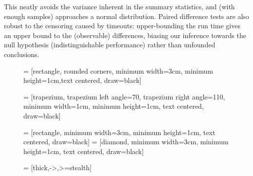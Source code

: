 This neatly avoids the variance inherent in the summary statistics, and (with
enough samples) approaches a normal distribution. Paired difference tests are
also robust to the censoring caused by timeouts: upper-bounding the run time
gives an upper bound to the (observable) differences, biasing our inference
towards the null hypothesis (indistinguishable performance) rather than
unfounded conclusions.

\begin{figure}
   = [rectangle, rounded corners, minimum width=3cm,
                           minimum height=1cm,text centered, draw=black]

   = [trapezium, trapezium left angle=70,
                    trapezium right angle=110, minimum width=1cm,
                    minimum height=1cm, text centered, draw=black]

   = [rectangle, minimum width=3cm, minimum height=1cm,
                         text centered, draw=black]
   = [diamond, minimum width=3cm, minimum height=1cm,
                          text centered, draw=black]

   = [thick,->,>=stealth]

  \tikzset{trapezium stretches=true}

  \centering
\end{figure}
